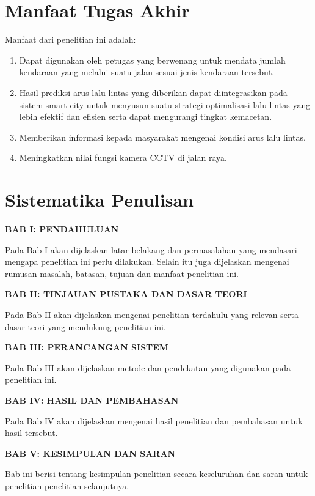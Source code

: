 \documentclass[../thesis.tex]{subfiles}
\begin{document}
\section{Manfaat Tugas Akhir}
Manfaat dari penelitian ini adalah:
\begin{enumerate}
\item Dapat digunakan oleh petugas yang berwenang untuk mendata jumlah kendaraan yang melalui suatu jalan sesuai jenis kendaraan tersebut.
\item Hasil prediksi arus lalu lintas yang diberikan dapat diintegrasikan pada sistem smart city untuk menyusun suatu strategi optimalisasi lalu lintas yang lebih efektif dan efisien serta dapat mengurangi tingkat kemacetan.
\item Memberikan informasi kepada masyarakat mengenai kondisi arus lalu lintas.
\item Meningkatkan nilai fungsi kamera CCTV di jalan raya.
\end{enumerate}

\section{Sistematika Penulisan}
\begin{flushleft}
    \textbf{BAB I: PENDAHULUAN} 
\end{flushleft}
\par
Pada Bab I akan dijelaskan latar belakang dan permasalahan yang mendasari mengapa
penelitian ini perlu dilakukan. Selain itu juga dijelaskan mengenai rumusan masalah, batasan,
tujuan dan manfaat penelitian ini.

\begin{flushleft}
    \textbf{BAB II: TINJAUAN PUSTAKA DAN DASAR TEORI} 
\end{flushleft}
\par
Pada Bab II akan dijelaskan mengenai penelitian terdahulu yang relevan serta dasar teori
yang mendukung penelitian ini.

\begin{flushleft}
    \textbf{BAB III: PERANCANGAN SISTEM} 
\end{flushleft}
\par
Pada Bab III akan dijelaskan metode dan pendekatan yang digunakan pada penelitian ini. 

\begin{flushleft}
    \textbf{BAB IV: HASIL DAN PEMBAHASAN} 
\end{flushleft}
\par
Pada Bab IV akan dijelaskan mengenai hasil penelitian dan pembahasan untuk hasil tersebut.

\begin{flushleft}
    \textbf{BAB V: KESIMPULAN DAN SARAN} 
\end{flushleft}
\par
Bab ini berisi tentang kesimpulan penelitian secara keseluruhan dan saran untuk
penelitian-penelitian selanjutnya.
\end{document}
